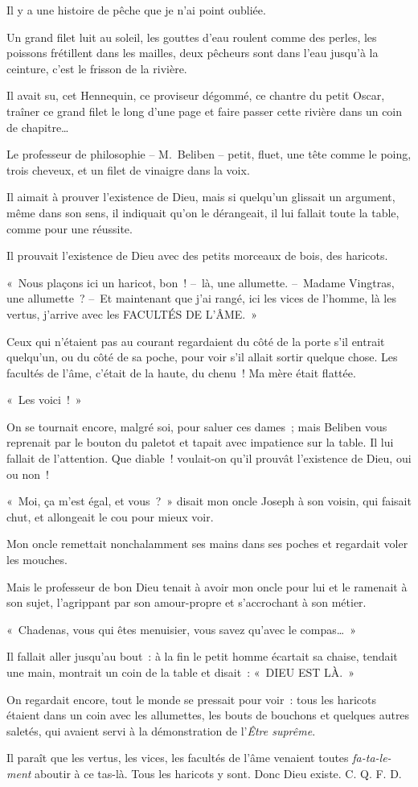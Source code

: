 \documentclass[french,twoside]{book} %
\begin{document}
Il y a une histoire de pêche que je n’ai point oubliée.\par
Un grand filet luit au soleil, les gouttes d’eau roulent comme des perles, les poissons frétillent dans les mailles, deux pêcheurs sont dans l’eau jusqu’à la ceinture, c’est le frisson de la rivière.\par
Il avait su, cet Hennequin, ce proviseur dégommé, ce chantre du petit Oscar, traîner ce grand filet le long d’une page et faire passer cette rivière dans un coin de chapitre…\par
\bigbreak
\noindent Le professeur de philosophie – M. Beliben – petit, fluet, une tête comme le poing, trois cheveux, et un filet de vinaigre dans la voix.\par
Il aimait à prouver l’existence de Dieu, mais si quelqu’un glissait un argument, même dans son sens, il indiquait qu’on le dérangeait, il lui fallait toute la table, comme pour une réussite.\par
Il prouvait l’existence de Dieu avec des petits morceaux de bois, des haricots.\par
« Nous plaçons ici un haricot, bon ! – là, une allumette. – Madame Vingtras, une allumette ? – Et maintenant que j’ai rangé, ici les vices de l’homme, là les vertus, j’arrive avec les FACULTÉS DE L’ÂME. »\par
Ceux qui n’étaient pas au courant regardaient du côté de la porte s’il entrait quelqu’un, ou du côté de sa poche, pour voir s’il allait sortir quelque chose. Les facultés de l’âme, c’était de la haute, du chenu ! Ma mère était flattée.\par
« Les voici ! »\par
On se tournait encore, malgré soi, pour saluer ces dames ; mais Beliben vous reprenait par le bouton du paletot et tapait avec impatience sur la table. Il lui fallait de l’attention. Que diable ! voulait-on qu’il prouvât l’existence de Dieu, oui ou non !\par
« Moi, ça m’est égal, et vous ? » disait mon oncle Joseph à son voisin, qui faisait chut, et allongeait le cou pour mieux voir.\par
Mon oncle remettait nonchalamment ses mains dans ses poches et regardait voler les mouches.\par
Mais le professeur de bon Dieu tenait à avoir mon oncle pour lui et le ramenait à son sujet, l’agrippant par son amour-propre et s’accrochant à son métier.\par
« Chadenas, vous qui êtes menuisier, vous savez qu’avec le compas… »\par
Il fallait aller jusqu’au bout : à la fin le petit homme écartait sa chaise, tendait une main, montrait un coin de la table et disait : « DIEU EST LÀ. »\par
On regardait encore, tout le monde se pressait pour voir : tous les haricots étaient dans un coin avec les allumettes, les bouts de bouchons et quelques autres saletés, qui avaient servi à la démonstration de l’\emph{Être suprême}.\par
Il paraît que les vertus, les vices, les facultés de l’âme venaient toutes \emph{fa-ta-le-ment} aboutir à ce tas-là. Tous les haricots y sont. Donc Dieu existe. C. Q. F. D.
\end{document}
